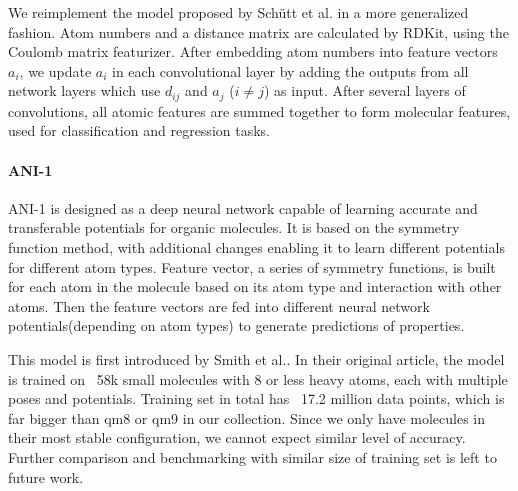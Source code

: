 We reimplement the model proposed by Sch\"{u}tt et al.\cite{schutt2016quantum} in a more generalized fashion. Atom numbers and a distance matrix are calculated by RDKit\cite{RDKit}, using the Coulomb matrix featurizer. After embedding atom numbers into feature vectors $a_i$, we update $a_i$ in each convolutional layer by adding the outputs from all network layers which use $d_{ij}$ and $a_j$ ($i\neq j$) as input. After several layers of convolutions, all atomic features are summed together to form molecular features, used for classification and regression tasks.

\paragraph{ANI-1}

ANI-1 is designed as a deep neural network capable of learning accurate and transferable potentials for organic molecules. It is based on the symmetry function method\cite{SymmetryFunction}, with additional changes enabling it to learn different potentials for different atom types. Feature vector, a series of symmetry functions, is built for each atom in the molecule based on its atom type and interaction with other atoms. Then the feature vectors are fed into different neural network potentials(depending on atom types) to generate predictions of properties.

This model is first introduced by Smith et al.\cite{ANI-1}. In their original article, the model is trained on ~58k small molecules with 8 or less heavy atoms, each with multiple poses and potentials. Training set in total has ~17.2 million data points, which is far bigger than qm8 or qm9 in our collection. Since we only have molecules in their most stable configuration, we cannot expect similar level of accuracy. Further comparison and benchmarking with similar size of training set is left to future work.

